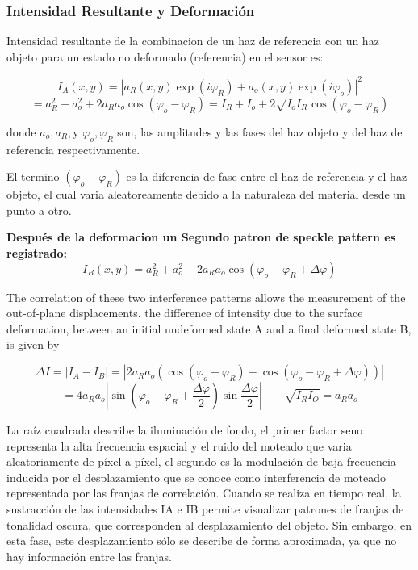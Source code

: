 \documentclass[12pt]{article}
\begin{document}
	\subsubsection*{Intensidad Resultante y Deformación}
	Intensidad resultante de la combinacion de un haz de referencia con un haz objeto para un estado no deformado (referencia) en el sensor es:
	
	\begin{equation*}
		I_A(x,y) = |a_R(x,y)\exp(i\varphi_R) + a_o(x,y)\exp(i\varphi_o)|^2
	\end{equation*}
	\begin{equation*}
		= a_R^2 + a_o^2 + 2a_Ra_o \cos(\varphi_o - \varphi_R) = I_R + I_o + 2\sqrt{I_o I_R}\cos(\varphi_o - \varphi_R)
	\end{equation*}
	
	donde $a_o, a_R, \text{y } \varphi_o, \varphi_R$ son, las amplitudes y las fases del haz objeto y del haz de referencia respectivamente.
	
	El termino $(\varphi_o - \varphi_R)$ es la diferencia de fase entre el haz de referencia y el haz objeto, el cual varia aleatoreamente debido a la naturaleza del material desde un punto a otro.
	
	\textbf{Después de la deformacion un Segundo patron de speckle pattern es registrado:}
	\begin{equation*}
		I_B(x,y) = a_R^2 + a_o^2 + 2a_Ra_o \cos(\varphi_o - \varphi_R + \Delta\varphi)
	\end{equation*}
	
	The correlation of these two interference patterns allows the measurement of the out-of-plane displacements. the difference of intensity due to the surface deformation, between an initial undeformed state A and a final deformed state B, is given by
	
	\begin{equation*}
		\Delta I = |I_A - I_B| = |2a_Ra_o (\cos(\varphi_o - \varphi_R) - \cos(\varphi_o - \varphi_R + \Delta\varphi))|
	\end{equation*}
	\begin{equation*}
		= 4a_Ra_o \left|\sin\left(\varphi_o - \varphi_R + \frac{\Delta\varphi}{2}\right) \sin\frac{\Delta\varphi}{2}\right| \qquad \sqrt{I_R I_O} = a_R a_o
	\end{equation*}
	
	La raíz cuadrada describe la iluminación de fondo, el primer factor seno representa la alta frecuencia espacial y el ruido del moteado que varia aleatoriamente de píxel a píxel, el segundo es la modulación de baja frecuencia inducida por el desplazamiento que se conoce como interferencia de moteado representada por las franjas de correlación. Cuando se realiza en tiempo real, la sustracción de las intensidades IA e IB permite visualizar patrones de franjas de tonalidad oscura, que corresponden al desplazamiento del objeto. Sin embargo, en esta fase, este desplazamiento sólo se describe de forma aproximada, ya que no hay información entre las franjas.
	
\end{document}
